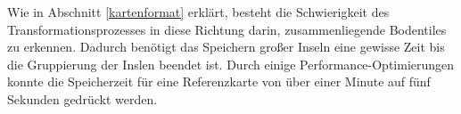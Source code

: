 Wie in Abschnitt \ref{kartenformat} erklärt, besteht die Schwierigkeit des
Transformationsprozesses in diese Richtung darin, zusammenliegende Bodentiles zu
erkennen. Dadurch benötigt das Speichern großer Inseln eine gewisse Zeit bis die
Gruppierung der Inslen beendet ist. Durch einige Performance-Optimierungen
konnte die Speicherzeit für eine Referenzkarte von über einer Minute auf fünf
Sekunden gedrückt werden.
